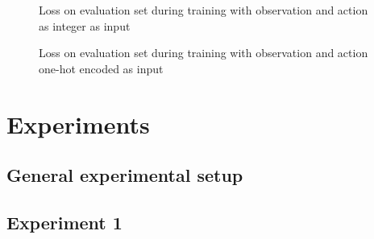 \documentclass[UKenglish]{uiomasterthesis}
\begin{document}
\begin{figure}[!ht]
	\caption{Loss on evaluation set during training with observation and action as integer as input}
	\label{fig:pred_loss_action} 
\end{figure}

\begin{figure}[!ht]
	\caption{Loss on evaluation set during training with observation and action one-hot encoded as input}
	\label{fig:pred_loss_one-hot} 
\end{figure}

%
%
%
%


\chapter{Experiments}

\section{General experimental setup}

\section{Experiment 1}
\end{document}
